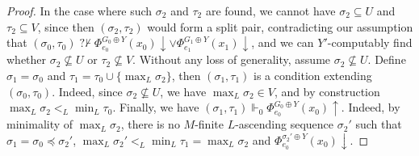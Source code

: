\documentclass{article}
\numberwithin{theorem}{section}
\newcommand{\nqvdash}{\operatorname{{?}{\nvdash}}}
\begin{document}
\begin{proof}
In the case where such $\sigma_2$ and $\tau_2$ are found, we cannot have $\sigma_2 \subseteq U$ and $\tau_2 \subseteq V$, since then $(\sigma_2, \tau_2)$ would form a split pair, contradicting our assumption that $(\sigma_0, \tau_0) \nqvdash \Phi_{e_0}^{G_0 \oplus Y}(x_0) \downarrow \vee \Phi_{e_1}^{G_1 \oplus Y}(x_1) \downarrow$, and we can $Y'$-computably find whether $\sigma_2 \not \subseteq U$ or $\tau_2 \not \subseteq V$. Without any loss of generality, assume $\sigma_2 \not \subseteq U$. Define $\sigma_1 = \sigma_0$ and $\tau_1 = \tau_0 \cup \{\max_L \sigma_2\}$, then $(\sigma_1, \tau_1)$ is a condition extending $(\sigma_0, \tau_0)$. Indeed, since $\sigma_2 \not \subseteq U$, we have $\max_L \sigma_2 \in V$, and by construction $\max_L \sigma_2 <_L \min_L \tau_0$. Finally, we have $(\sigma_1, \tau_1) \Vdash_0 \Phi_{e_0}^{G_0 \oplus Y}(x_0) \uparrow$. Indeed, by minimality of $\max_L \sigma_2$, there is no $M$-finite $L$-ascending sequence $\sigma_2'$ such that $\sigma_1 = \sigma_0 \preceq \sigma_2'$, $\max_L \sigma_2' <_L \min_L \tau_1 = \max_L \sigma_2$ and $\Phi_{e_0}^{\sigma_2' \oplus Y}(x_0) \downarrow$.
\end{proof}
\end{document}
